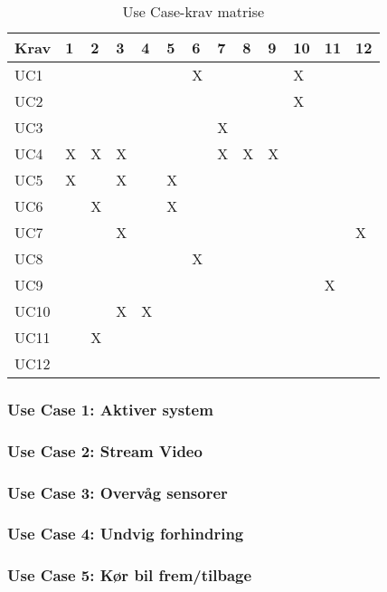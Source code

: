 \begin{table}[h]
\centering
\begin{tabularx}{\textwidth-5cm}{| L{1 cm} | X | X | X | X | X | X | X | X | X | X | X | X |}
\hline
Krav&1&2&3&4&5&6&7&8&9&10&11&12 \\ \hline
UC1 & & & & & &X& & & &X &  &   \\ \hline
UC2 & & & & & & & & & &X &  &   \\ \hline
UC3 & & & & & & &X& & &  &  &   \\ \hline
UC4 &X&X&X& & & &X&X&X&  &  &   \\ \hline
UC5 &X& &X& &X& & & & &  &  &   \\ \hline
UC6 & &X& & &X& & & & &  &  &   \\ \hline
UC7 & & &X& & & & & & &  &  &X  \\ \hline
UC8 & & & & & &X& & & &  &  &   \\ \hline
UC9 & & & & & & & & & &  &X &   \\ \hline
UC10& & &X&X& & & & & &  &  &   \\ \hline
UC11& &X& & & & & & & &  &  &   \\ \hline
UC12& & & & & & & & & &  &  &   \\ \hline
\end{tabularx}
\caption{Use Case-krav matrise}
\label{tbl:kravucmatrise}
\end{table}

\subsubsection{Use Case 1: Aktiver system}
\clearpage
\subsubsection{Use Case 2: Stream Video}
\clearpage
\subsubsection{Use Case 3: Overvåg sensorer}
\clearpage
\subsubsection{Use Case 4: Undvig forhindring}
\clearpage
\subsubsection{Use Case 5: Kør bil frem/tilbage}
\clearpage
